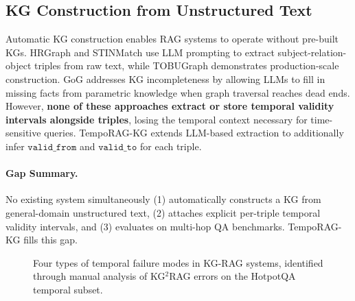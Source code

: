 \documentclass[11pt]{article}
\begin{document}
\subsection{KG Construction from Unstructured Text}

Automatic KG construction enables RAG systems to operate without pre-built
KGs. HRGraph \cite{hrgraph2024} and STINMatch \cite{stinmatch2023} use LLM
prompting to extract subject-relation-object triples from raw text, while
TOBUGraph \cite{tobugraph2024} demonstrates production-scale construction.
GoG \cite{he2024gog} addresses KG incompleteness by allowing LLMs to fill
in missing facts from parametric knowledge when graph traversal reaches
dead ends. However, \textbf{none of these approaches extract or store
temporal validity intervals alongside triples}, losing the temporal context
necessary for time-sensitive queries. TempoRAG-KG extends LLM-based
extraction to additionally infer $\mathtt{valid\_from}$ and
$\mathtt{valid\_to}$ for each triple.

\paragraph{Gap Summary.}
No existing system simultaneously (1) automatically constructs a KG from
general-domain unstructured text, (2) attaches explicit per-triple temporal
validity intervals, and (3) evaluates on multi-hop QA benchmarks. TempoRAG-KG
fills this gap.

\begin{figure}[t]
  \centering
  \caption{Four types of temporal failure modes in KG-RAG systems,
  identified through manual analysis of KG$^2$RAG errors on the
  HotpotQA temporal subset.}
  \label{fig:taxonomy}
\end{figure}
\end{document}
